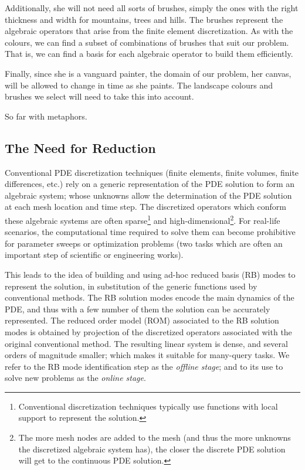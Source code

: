 \documentclass[thesis.tex]{subfiles}
\begin{document}
Additionally, she will not need all sorts of brushes, 
simply the ones with the right thickness and width for mountains, trees and hills.
The brushes represent the algebraic operators that arise from the finite element discretization.
As with the colours, we can find a subset of combinations of brushes that suit our problem.
That is, we can find a basis for each algebraic operator to build them efficiently.

Finally, since she is a vanguard painter, the domain of our problem, her canvas, 
will be allowed to change in time as she paints.
The landscape colours and brushes we select will need to take this into account.

So far with metaphors.

\subsection{The Need for Reduction}
Conventional PDE discretization techniques 
(finite elements, finite volumes, finite differences, etc.) 
rely on a generic representation of the PDE solution
to form an algebraic system; 
whose unknowns allow the determination of the PDE solution
at each mesh location and time step. 
The discretized operators which conform these algebraic systems
are often sparse\footnote
{
    Conventional discretization techniques typically 
    use functions with local support to represent the solution.
}
and high-dimensional\footnote
{
    The more mesh nodes are added to the mesh
    (and thus the more unknowns the discretized algebraic system has),
    the closer the discrete PDE solution will get to the continuous PDE solution.
}.
For real-life scenarios, the computational time
required to solve them 
can become prohibitive 
for parameter sweeps or optimization problems
(two tasks which are often an important step of scientific or engineering works).

This leads to the idea of building and using
ad-hoc reduced basis (RB) modes 
to represent the solution, 
in substitution of the generic functions used by conventional methods.
The RB solution modes encode the main dynamics of the PDE,
and thus with a few number of them the solution can be accurately represented.   
The reduced order model (ROM) associated to the RB solution modes is 
obtained by projection of the discretized operators associated 
with the original conventional method.
The resulting linear system is dense,
and several orders of magnitude smaller;
which makes it suitable for many-query tasks.
We refer to the RB mode identification step as the 
\textit{offline stage};
and to its use to solve new problems as the
\textit{online stage}.
\end{document}
